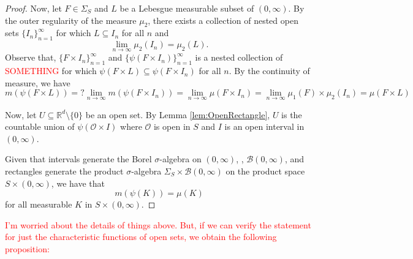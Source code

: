 \documentclass[11pt]{article}
\theoremstyle{theorem}
\begin{document}
\begin{proof}
Now, let $F\in\Sigma_S$ and $L$ be a Lebesgue measurable subset of $(0,\infty)$. By the outer regularity of the measure $\mu_2$, there exists a collection of nested open sets $\{I_n\}_{n=1}^\infty$ for which $L\subseteq I_n$ for all $n$ and 
\begin{equation*}
\lim_{n\to\infty}\mu_2(I_n)=\mu_2(L).
\end{equation*}
Observe that, $\{F\times I_n\}_{n=1}^\infty$ and $\{\psi(F\times I_n)\}_{n=1}^\infty$ is a nested collection of \textcolor{red}{SOMETHING} for which $\psi(F\times L)\subseteq \psi(F\times I_n)$ for all $n$. By the continuity of measure, we have
\begin{equation*}
m(\psi(F\times L))=?\lim_{n\to\infty}m(\psi(F\times I_n))=\lim_{n\to\infty}\mu(F\times I_n)=\lim_{n\to\infty}\mu_1(F)\times\mu_2(I_n)=\mu(F\times L)
\end{equation*}

Now, let $U\subseteq \mathbb{R}^d\setminus\{0\}$ be an open set. By Lemma \ref{lem:OpenRectangle}, $U$ is the countable union of $\psi(\mathcal{O}\times I)$ where $\mathcal{O}$ is open in $S$ and $I$ is an open interval in $(0,\infty)$.








Given that intervals generate the Borel $\sigma$-algebra on $(0,\infty)$, , $\mathcal{B}(0,\infty)$,  and rectangles generate the product $\sigma$-algebra $\Sigma_S\times \mathcal{B}(0,\infty)$ on the product space $S\times (0,\infty)$, we have that
\begin{equation*}
m(\psi(K))=\mu(K)
\end{equation*}
for all measurable $K$ in $S\times (0,\infty)$. 
\end{proof}


\textcolor{red}{I'm worried about the details of things above. But, if we can verify the statement for just the characteristic functions of open sets, we obtain the following proposition:}
\end{document}
